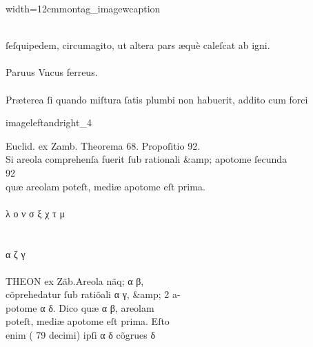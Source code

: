 \vspace{2mm}
\begin{sampleImageSmall}{width=12cm}{montag_imagewcaption}
\begin{typeLatin}
 \someText \\
ſeſquipedem, circumagito, ut altera pars æquè caleſcat ab igni.\\
 \\
Paruus Vncus ferreus.\\
 \\
Præterea ſi quando miſtura ſatis plumbi non habuerit, addito cum forci  \\
\someText {}
\end{typeLatin}
\end{sampleImageSmall}

\begin{sampleImage}{imageleftandright_4}
\begin{typeLatin}
Euclid. ex Zamb. T\lwr{}heorema 68. P\lwr{}ropoſitio 92. \\
Si areola comprehenſa fuerit ſub rationali &amp; apotome ſecunda \\
92\\
quæ areolam poteſt, mediæ apotome eſt prima. \\
 \\
λ  ο  ν  σ ξ χ  τ μ \\
 \\
\\
α   ζ  γ     \\
 \\
THEON ex Zãb.\lwr {}Areola nãq; α β, \\
cõpreh\bs\tld{}edatur ſub ratiõali α γ, \&amp; 2 a- \\
potome α δ. Dico  quæ α β, areolam\\
poteſt, mediæ apotome eſt prima. Eſto\\
enim ( 79 decimi) ipſi α δ cõgru\bs\tld{}es δ\\
\someText {}\\
\end{typeLatin}
\end{sampleImage}


